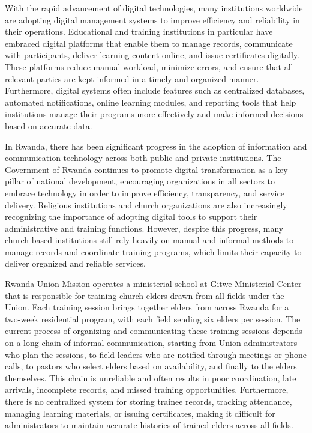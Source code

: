\documentclass[12pt]{report}
\begin{document}
With the rapid advancement of digital technologies, many institutions worldwide are adopting digital management systems to improve efficiency and reliability in their operations. Educational and training institutions in particular have embraced digital platforms that enable them to manage records, communicate with participants, deliver learning content online, and issue certificates digitally. These platforms reduce manual workload, minimize errors, and ensure that all relevant parties are kept informed in a timely and organized manner. Furthermore, digital systems often include features such as centralized databases, automated notifications, online learning modules, and reporting tools that help institutions manage their programs more effectively and make informed decisions based on accurate data.

In Rwanda, there has been significant progress in the adoption of information and communication technology across both public and private institutions. The Government of Rwanda continues to promote digital transformation as a key pillar of national development, encouraging organizations in all sectors to embrace technology in order to improve efficiency, transparency, and service delivery. Religious institutions and church organizations are also increasingly recognizing the importance of adopting digital tools to support their administrative and training functions. However, despite this progress, many church-based institutions still rely heavily on manual and informal methods to manage records and coordinate training programs, which limits their capacity to deliver organized and reliable services.

Rwanda Union Mission operates a ministerial school at Gitwe Ministerial Center that is responsible for training church elders drawn from all fields under the Union. Each training session brings together elders from across Rwanda for a two-week residential program, with each field sending six elders per session. The current process of organizing and communicating these training sessions depends on a long chain of informal communication, starting from Union administrators who plan the sessions, to field leaders who are notified through meetings or phone calls, to pastors who select elders based on availability, and finally to the elders themselves. This chain is unreliable and often results in poor coordination, late arrivals, incomplete records, and missed training opportunities. Furthermore, there is no centralized system for storing trainee records, tracking attendance, managing learning materials, or issuing certificates, making it difficult for administrators to maintain accurate histories of trained elders across all fields.
\end{document}
